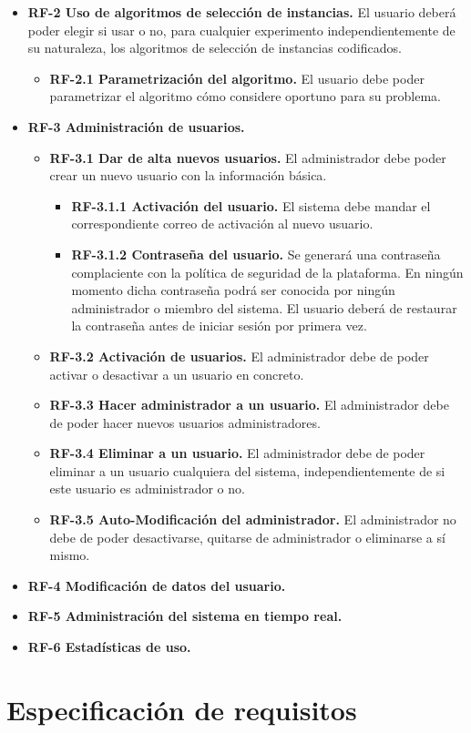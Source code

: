 \begin{itemize}
\item \textbf{RF-2 Uso de algoritmos de selección de instancias.} El usuario deberá poder elegir si usar o no, para cualquier experimento independientemente de su naturaleza, los algoritmos de selección de instancias codificados.
	\begin{itemize}
	\tightlist
	\item \textbf{RF-2.1 Parametrización del algoritmo.} El usuario debe poder parametrizar el algoritmo cómo considere oportuno para su problema.
\end{itemize}
\item \textbf{RF-3 Administración de usuarios.}
	\begin{itemize}
	\tightlist
	\item \textbf{RF-3.1 Dar de alta nuevos usuarios.} El administrador debe poder crear un nuevo usuario con la información básica.
	\begin{itemize}
	\tightlist
	\item \textbf{RF-3.1.1 Activación del usuario.} El sistema debe mandar el correspondiente correo de activación al nuevo usuario.
	\item \textbf{RF-3.1.2 Contraseña del usuario.} Se generará una contraseña complaciente con la política de seguridad de la plataforma. En ningún momento dicha contraseña podrá ser conocida por ningún administrador o miembro del sistema. El usuario deberá de restaurar la contraseña antes de iniciar sesión por primera vez.
	\end{itemize}
	\item \textbf{RF-3.2 Activación de usuarios.} El administrador debe de poder activar o desactivar a un usuario en concreto.
	\item \textbf{RF-3.3 Hacer administrador a un usuario.} El administrador debe de poder hacer nuevos usuarios administradores.
	\item \textbf{RF-3.4 Eliminar a un usuario.} El administrador debe de poder eliminar a un usuario cualquiera del sistema, independientemente de si este usuario es administrador o no.
	\item \textbf{RF-3.5 Auto-Modificación del administrador.} El administrador no debe de poder desactivarse, quitarse de administrador o eliminarse a sí mismo.
	\end{itemize}
\item \textbf{RF-4 Modificación de datos del usuario.}

\item \textbf{RF-5 Administración del sistema en tiempo real.}

\item \textbf{RF-6 Estadísticas de uso.}
\end{itemize}

\newpage
\section{Especificación de requisitos}


